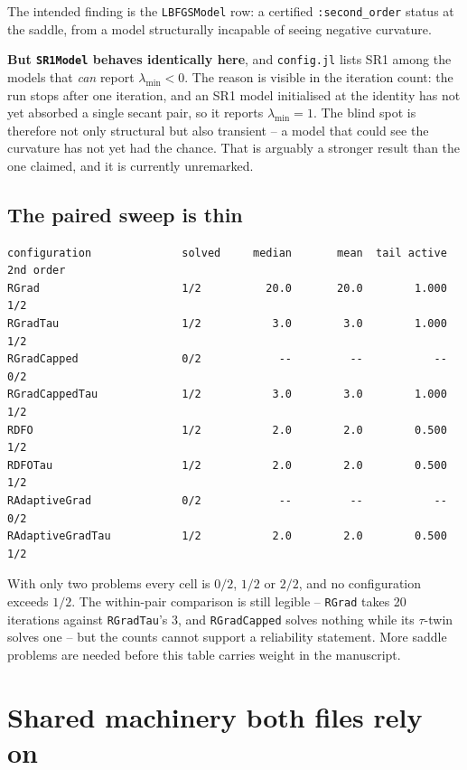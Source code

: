 \documentclass[11pt,a4paper]{article}
\newcommand{\jl}[1]{\texttt{\small #1}}
\newcommand{\file}[1]{\texttt{\small #1}}
\newcommand{\finding}[1]{\textcolor{Alert}{\textbf{#1}}}
\begin{document}
The intended finding is the \jl{LBFGSModel} row: a certified \jl{:second\_order}
status at the saddle, from a model structurally incapable of seeing negative
curvature.

\finding{But \jl{SR1Model} behaves identically here}, and \file{config.jl} lists
SR1 among the models that \emph{can} report $\lambda_{\min} < 0$. The reason is
visible in the iteration count: the run stops after one iteration, and an SR1 model
initialised at the identity has not yet absorbed a single secant pair, so it
reports $\lambda_{\min} = 1$. The blind spot is therefore not only structural but
also transient -- a model that could see the curvature has not yet had the chance.
That is arguably a stronger result than the one claimed, and it is currently
unremarked.

\subsection{The paired sweep is thin}

\begin{lstlisting}
configuration              solved     median       mean  tail active  2nd order
RGrad                      1/2          20.0       20.0        1.000     1/2
RGradTau                   1/2           3.0        3.0        1.000     1/2
RGradCapped                0/2            --         --           --     0/2
RGradCappedTau             1/2           3.0        3.0        1.000     1/2
RDFO                       1/2           2.0        2.0        0.500     1/2
RDFOTau                    1/2           2.0        2.0        0.500     1/2
RAdaptiveGrad              0/2            --         --           --     0/2
RAdaptiveGradTau           1/2           2.0        2.0        0.500     1/2
\end{lstlisting}

With only two problems every cell is $0/2$, $1/2$ or $2/2$, and no configuration
exceeds $1/2$. The within-pair comparison is still legible -- \jl{RGrad} takes 20
iterations against \jl{RGradTau}'s 3, and \jl{RGradCapped} solves nothing while its
$\tau$-twin solves one -- but the counts cannot support a reliability statement.
More saddle problems are needed before this table carries weight in the manuscript.

\section{Shared machinery both files rely on}
\end{document}
